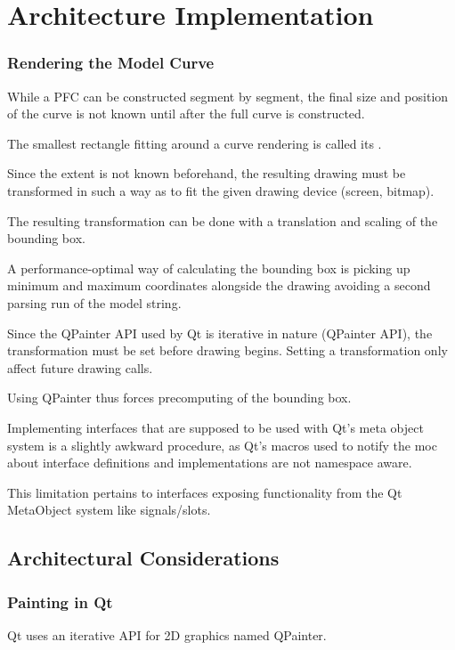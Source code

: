 \chapter{Architecture Implementation}

\subsection{Rendering the Model Curve}
While a PFC can be constructed segment by segment, the final size and position of the curve is not known until after the full curve is constructed.

The smallest rectangle fitting around a curve rendering is called its .

Since the extent is not known beforehand, the resulting drawing must be transformed in such a way as to fit the given drawing device (screen, bitmap).

The resulting transformation can be done with a translation and scaling of the bounding box.

A performance-optimal way of calculating the bounding box is picking up minimum and maximum coordinates alongside the drawing avoiding a second parsing run of the model string.

Since the \term QPainter API used by Qt is iterative in nature (\term QPainter API), the transformation must be set before drawing begins. Setting a transformation only affect future drawing calls.

Using \term QPainter thus forces precomputing of the bounding box.


Implementing interfaces that are supposed to be used with Qt's meta object system is a slightly awkward procedure, as Qt's macros used to notify the moc about interface definitions and implementations are not namespace aware. 

This limitation pertains to interfaces exposing functionality from the Qt MetaObject system like signals/slots.

\section{Architectural Considerations}

\subsection{Painting in Qt}
Qt uses an iterative API for 2D graphics named QPainter.

